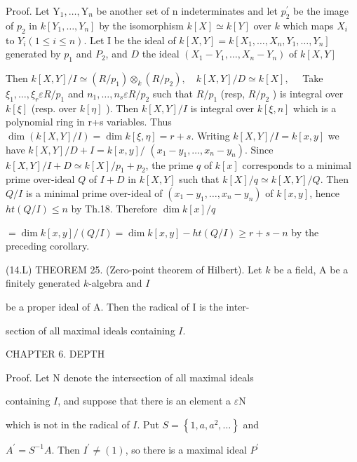 Proof. Let $\mathrm{Y}_{1}, \ldots, \mathrm{Y}_{n}$ be another set of $\mathrm{n}$ indeterminates and let $p_{2}^{\prime}$ be the image of $p_{2}$ in $k\left[Y_{1}, \ldots, Y_{n}\right]$ by the isomorphism $k[X] \simeq k[Y]$ over $k$ which maps $X_{i}$ to $Y_{i}(1 \leqslant i \leqslant n)$. Let I be the ideal of $k[X, Y]=k\left[X_{1}, \ldots, X_{n}, Y_{1}, \ldots, Y_{n}\right]$ generated by $p_{1}$ and $P_{2}$, and $D$ the ideal $\left(X_{1}-Y_{1}, \ldots, X_{n}-Y_{n}\right)$ of $k[X, Y]$

Then $k[X, Y] / I \simeq\left(R / p_{1}\right) \otimes_{k}\left(R / p_{2}\right), \quad k[X, Y] / D \simeq k[X], \quad$ Take $\xi_{1}, \ldots, \xi_{r} \varepsilon R / p_{1}$ and $n_{1}, \ldots, n_{s} \varepsilon R / p_{2}$ such that $R / p_{1}$ (resp, $R / p_{2}$ ) is integral over $k[\xi]$ (resp. over $k[\eta]$ ). Then $k[X, Y] / I$ is integral over $k[\xi, n]$ which is a polynomial ring in r+s variables. Thus $\operatorname{dim}(k[X, Y] / I)=\operatorname{dim} k[\xi, \eta]=r+s$. Writing $k[X, Y] / I=k[x, y]$ we have $k[X, Y] / D+I=k[x, y] /$ $\left(x_{1}-y_{1}, \ldots, x_{n}-y_{n}\right)$. Since $k[X, Y] / I+D \simeq k[X] / p_{1}+p_{2}$, the prime $q$ of $k[x]$ corresponds to a minimal prime over-ideal $Q$ of $I+D$ in $k[X, Y]$ such that $k[X] / q \simeq k[X, Y] / Q$. Then $Q / I$ is a minimal prime over-ideal of $\left(x_{1}-y_{1}, \ldots, x_{n}-y_{n}\right)$ of $k[x, y]$, hence $h t(Q / I) \leqslant n$ by Th.18. Therefore $\operatorname{dim} k[x] / q$

$=\operatorname{dim} k[x, y] /(Q / I)=\operatorname{dim} k[x, y]-h t(Q / I) \geqslant r+s-n$ by the preceding corollary.

(14.L) THEOREM 25. (Zero-point theorem of Hilbert). Let $k$ be a field, A be a finitely generated $k$-algebra and $I$

be a proper ideal of A. Then the radical of I is the inter-

section of all maximal ideals containing $I$.

CHAPTER 6. DEPTH

Proof. Let $\mathrm{N}$ denote the intersection of all maximal ideals

containing $I$, and suppose that there is an element a $\varepsilon \mathrm{N}$

which is not in the radical of $I$. Put $S=\left\{1, a, a^{2}, \ldots\right\}$ and

$A^{\prime}=S^{-1} A$. Then $I^{\prime} \neq(1)$, so there is a maximal ideal $P^{\prime}$

